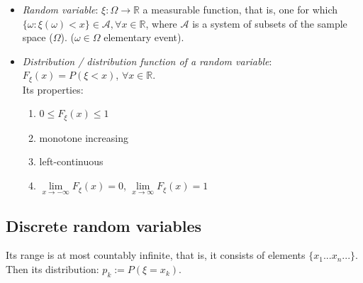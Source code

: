 \documentclass[margin=0px]{article}
\begin{document}
\begin{itemize}
    \item \textit{Random variable}: $\xi : \Omega \to \mathbb{R}$ a measurable function, that is, one for which $\{\omega : \xi(\omega) < x\} \in \mathcal{A}, \forall x \in \mathbb{R}$, where $\mathcal{A}$ is a system of subsets of the sample space ($\Omega$). ($\omega \in \Omega$ elementary event).
    \item \textit{Distribution / distribution function of a random variable}: $F_{\xi}(x) = P(\xi < x)$, $\forall x \in \mathbb{R}$. \\
          Its properties:
          \begin{enumerate}
              \item $0 \leq F_{\xi}(x) \leq 1$
              \item monotone increasing
              \item left-continuous
              \item $\lim\limits_{x \to -\infty}{F_{\xi}(x)} = 0$, $\lim\limits_{x \to \infty}{F_{\xi}(x)} = 1$
          \end{enumerate}
\end{itemize}

\subsection{Discrete random variables}

Its range is at most countably infinite, that is, it consists of elements $\{x_1 ... x_n ... \}$. Then its distribution: $p_k := P(\xi = x_k)$.
\end{document}
